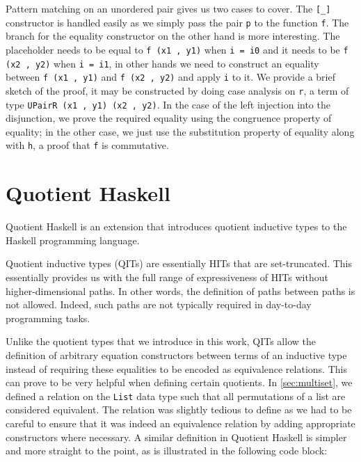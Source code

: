 \documentclass[12pt,twoside,maitrise]{dms}
\theoremstyle{definition}
\numberwithin{equation}{section}
\numberwithin{table}{chapter}
\numberwithin{figure}{chapter}
\newcommand\id[1] {\texttt{#1}}
\newcommand\fn[1] {\texttt{#1}}
\begin{document}
Pattern matching on an unordered pair gives us two cases to cover. The \id{[\_]}
constructor is handled easily as we simply pass the pair \id{p} to the function
\id{f}. The branch for the equality constructor on the other hand is more
interesting. The placeholder needs to be equal to \fn{f (x1 , y1)} when \fn{i =
  i0} and it needs to be \fn{f (x2 , y2)} when \fn{i = i1}, in other hands we
need to construct an equality between \fn{f (x1 , y1)} and \fn{f (x2 , y2)} and
apply \id{i} to it. We provide a brief sketch of the proof, it may be
constructed by doing case analysis on \id{r}, a term of type \fn{UPairR (x1 ,
  y1) (x2 , y2)}. In the case of the left injection into the disjunction, we
prove the required equality using the congruence property of equality; in the
other case, we just use the substitution property of equality along with \id{h},
a proof that \id{f} is commutative.

\section{Quotient Haskell}\label{sec:related-qit}

Quotient Haskell is an extension that introduces quotient inductive types to the
Haskell programming language.

Quotient inductive types (QITs) are essentially HITs that are set-truncated.
This essentially provides us with the full range of expressiveness of HITs
without higher-dimensional paths. In other words, the definition of paths
between paths is not allowed. Indeed, such paths are not typically required in
day-to-day programming tasks.

Unlike the quotient types that we introduce in this work, QITs allow the
definition of arbitrary equation constructors between terms of an inductive type
instead of requiring these equalities to be encoded as equivalence relations.
This can prove to be very helpful when defining certain quotients. In
\autoref{sec:multiset}, we defined a relation on the \id{List} data type such
that all permutations of a list are considered equivalent. The relation was
slightly tedious to define as we had to be careful to ensure that it was indeed
an equivalence relation by adding appropriate constructors where necessary. A similar
definition in Quotient Haskell\cite{hewer2023quotient} is simpler and more straight
to the point, as is illustrated in the following code block:
\end{document}
